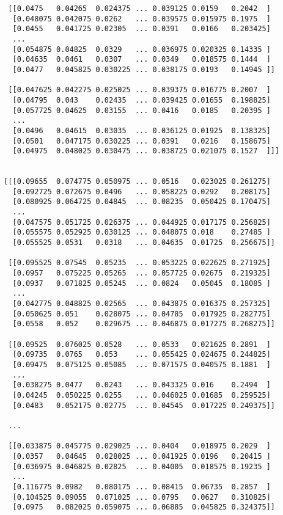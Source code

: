 \documentclass[
  letterpaper,
  DIV=11,
  numbers=noendperiod]{scrreprt}
\begin{document}
\begin{verbatim}
  [[0.0475   0.04265  0.024375 ... 0.039125 0.0159   0.2042  ]
   [0.048075 0.042075 0.0262   ... 0.039575 0.015975 0.1975  ]
   [0.0455   0.041725 0.02305  ... 0.0391   0.0166   0.203425]
   ...
   [0.054875 0.04825  0.0329   ... 0.036975 0.020325 0.14335 ]
   [0.04635  0.0461   0.0307   ... 0.0349   0.018575 0.1444  ]
   [0.0477   0.045825 0.030225 ... 0.038175 0.0193   0.14945 ]]

  [[0.047625 0.042275 0.025025 ... 0.039375 0.016775 0.2007  ]
   [0.04795  0.043    0.02435  ... 0.039425 0.01655  0.198825]
   [0.057725 0.04625  0.03155  ... 0.0416   0.0185   0.20395 ]
   ...
   [0.0496   0.04615  0.03035  ... 0.036125 0.01925  0.138325]
   [0.0501   0.047175 0.030225 ... 0.0391   0.0216   0.158675]
   [0.04975  0.048025 0.030475 ... 0.038725 0.021075 0.1527  ]]]


 [[[0.09655  0.074775 0.050975 ... 0.0516   0.023025 0.261275]
   [0.092725 0.072675 0.0496   ... 0.058225 0.0292   0.208175]
   [0.080925 0.064725 0.04845  ... 0.08235  0.050425 0.170475]
   ...
   [0.047575 0.051725 0.026375 ... 0.044925 0.017175 0.256825]
   [0.055575 0.052925 0.030125 ... 0.048075 0.018    0.27485 ]
   [0.055525 0.0531   0.0318   ... 0.04635  0.01725  0.256675]]

  [[0.095525 0.07545  0.05235  ... 0.053225 0.022625 0.271925]
   [0.0957   0.075225 0.05265  ... 0.057725 0.02675  0.219325]
   [0.0937   0.071825 0.05245  ... 0.0824   0.05045  0.18085 ]
   ...
   [0.042775 0.048825 0.02565  ... 0.043875 0.016375 0.257325]
   [0.050625 0.051    0.028075 ... 0.04785  0.017925 0.282775]
   [0.0558   0.052    0.029675 ... 0.046875 0.017275 0.268275]]

  [[0.09525  0.076025 0.0528   ... 0.0533   0.021625 0.2891  ]
   [0.09735  0.0765   0.053    ... 0.055425 0.024675 0.244825]
   [0.09475  0.075125 0.05085  ... 0.071575 0.040575 0.1881  ]
   ...
   [0.038275 0.0477   0.0243   ... 0.043325 0.016    0.2494  ]
   [0.04245  0.050225 0.0255   ... 0.046025 0.01685  0.259525]
   [0.0483   0.052175 0.02775  ... 0.04545  0.017225 0.249375]]

  ...

  [[0.033875 0.045775 0.029025 ... 0.0404   0.018975 0.2029  ]
   [0.0357   0.04645  0.028025 ... 0.041925 0.0196   0.20415 ]
   [0.036975 0.046825 0.02825  ... 0.04005  0.018575 0.19235 ]
   ...
   [0.116775 0.0982   0.080175 ... 0.08415  0.06735  0.2857  ]
   [0.104525 0.09055  0.071025 ... 0.0795   0.0627   0.310825]
   [0.0975   0.082025 0.059075 ... 0.06885  0.045825 0.324375]]


\end{verbatim}
\end{document}
